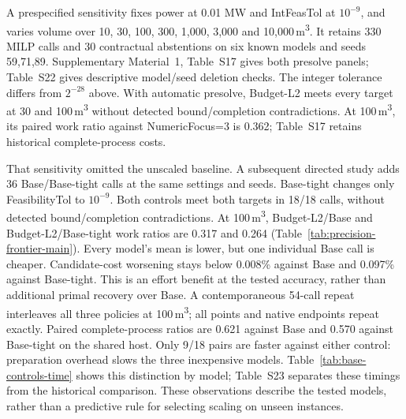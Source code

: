 \documentclass[11pt]{article}
\theoremstyle{definition}
\theoremstyle{remark}
\begin{document}
\begin{table}[tb]
\centering\small\setlength{\tabcolsep}{3pt}
\caption{Fully matched accuracy and numerical remedies: six known models, seeds
11, 23, 47, and 18 terminal calls per policy/presolve cell. ``Budgets'' counts points meeting
all 4,320 audited rows after integer rounding at 0.01 MW and
100\,m\textsuperscript{3}. For minimization, $B>U$ counts reported lower
bounds above an exact feasible objective $U$ of the actual imported export, allowing
the larger of $10^{-6}$ objective units and eight bound ulps. Gap flags count cases
satisfying $U<C-0.01|C|$. These contradict a reported 1\% completion at objective $C$.
Work is the geometric mean of all terminal calls, including flagged completions;
Total is the median full-process time on the shared local machine. One additional
attempt interrupted by a reboot is retained separately. Lower work or absence of
a detected flag does not certify bounds or optimality. Presolve panels are not
pooled. Supplementary Material~1, Table~S16 gives residuals, per-model outcomes
and the complete protocol.}
\label{tab:activation-summary}

\end{table}

A prespecified sensitivity fixes power at 0.01 MW and IntFeasTol at $10^{-9}$,
and varies volume over 10, 30, 100, 300, 1,000, 3,000 and
10,000\,m\textsuperscript{3}. It retains 330 MILP calls and 30 contractual
abstentions on six known models and seeds 59,71,89. Supplementary Material~1,
Table~S17 gives both presolve panels; Table~S22 gives descriptive model/seed
deletion checks. The integer tolerance differs from $2^{-28}$ above.
With automatic presolve, Budget-L2 meets every target at 30 and
100\,m\textsuperscript{3} without detected bound/completion contradictions.
At 100\,m\textsuperscript{3}, its paired work ratio against NumericFocus=3 is
0.362; Table~S17 retains historical complete-process costs.

That sensitivity omitted the unscaled baseline. A subsequent directed study adds
36 Base/Base-tight calls at the same settings and seeds. Base-tight changes only
FeasibilityTol to $10^{-9}$. Both controls meet both targets in 18/18 calls,
without detected bound/completion contradictions. At 100\,m\textsuperscript{3},
Budget-L2/Base and Budget-L2/Base-tight work ratios are 0.317 and 0.264
(Table~\ref{tab:precision-frontier-main}). Every model's mean is lower, but one
individual Base call is cheaper. Candidate-cost worsening stays below 0.008\%
against Base and 0.097\% against Base-tight. This is an effort benefit at the
tested accuracy, rather than additional primal recovery over Base.
A contemporaneous 54-call repeat interleaves all three policies at
100\,m\textsuperscript{3}; all points and native endpoints repeat exactly.
Paired complete-process ratios are 0.621 against Base and 0.570 against
Base-tight on the shared host. Only 9/18 pairs are faster against either control:
preparation overhead slows the three inexpensive models. Table~\ref{tab:base-controls-time}
shows this distinction by model; Table~S23 separates these timings from the
historical comparison. These observations describe the tested models, rather
than a predictive rule for selecting scaling on unseen instances.
\end{document}
